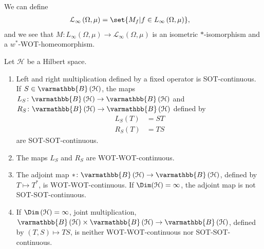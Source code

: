 \documentclass[10pt]{mypackage}
\renewcommand*{\mathbb}[1]{\varmathbb{#1}}
\newcommand{\B}{\mathbb{B}}
\begin{document}
\begin{example}
  We can define
  \begin{align*}
    \mathcal{L}_{\infty}\left(\Omega,\mu\right) &= \set{M_{f} | f\in L_{\infty}\left(\Omega,\mu\right)},
  \end{align*}
  and we see that $M: L_{\infty}\left(\Omega,\mu\right) \rightarrow \mathcal{L}_{\infty}\left(\Omega,\mu\right)$ is an isometric $\ast$-isomorphism and a $w^{\ast}$-WOT-homeomorphism.
\end{example}
\begin{proposition}
  Let $\mathcal{H}$ be a Hilbert space.
  \begin{enumerate}[(1)]
    \item Left and right multiplication defined by a fixed operator is SOT-continuous. If $S\in \B\left(\mathcal{H}\right)$, the maps $L_{S}\colon \B\left(\mathcal{H}\right)\rightarrow \B\left(\mathcal{H}\right)$ and $R_{S}\colon \B\left(\mathcal{H}\right)\rightarrow \B\left(\mathcal{H}\right)$ defined by
      \begin{align*}
        L_S\left(T\right) &= ST\\
        R_{S}\left(T\right) &= TS
      \end{align*}
      are SOT-SOT-continuous.
    \item The maps $L_S$ and $R_S$ are WOT-WOT-continuous.
    \item The adjoint map $\ast\colon \B\left(\mathcal{H}\right)\rightarrow \B\left(\mathcal{H}\right)$, defined by $T\mapsto T^{\ast}$, is WOT-WOT-continuous. If $\Dim(\mathcal{H}) = \infty$, the adjoint map is not SOT-SOT-continuous.
    \item If $\Dim\left(\mathcal{H}\right) = \infty$, joint multiplication, $\B\left(\mathcal{H}\right)\times \B\left(\mathcal{H}\right)\rightarrow \B\left(\mathcal{H}\right)$, defined by $\left(T,S\right)\mapsto TS$, is neither WOT-WOT-continuous nor SOT-SOT-continuous.
  \end{enumerate}
\end{proposition}
\end{document}
